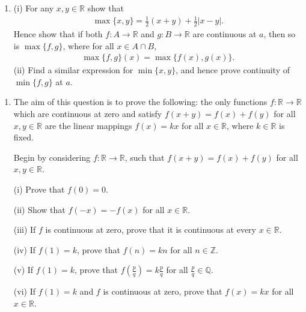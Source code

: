 \documentclass[letterpaper,10pt,english]{jupyterBook}
\begin{document}
\label{\detokenize{Problems:id20}}\begin{enumerate}
%
\setcounter{enumi}{19}
\item {} 
\sphinxAtStartPar
(i) For any \(x, y \in \mathbb{R}\) show that
\begin{equation*}
\begin{split}
    \max\{x, y\} = \frac{1}{2}(x + y) + \frac{1}{2}|x - y|.
    \end{split}
\end{equation*}
\sphinxAtStartPar
Hence show that if both \(f:A\to \mathbb{R}\) and \(g: B \rightarrow \mathbb{R}\) are continuous at \(a\), then so is \(\max\{f, g\}\), where for all \(x \in A\cap B\),
\begin{equation*}
\begin{split}
    \max\{f, g\}(x)  = \max\{f(x), g(x)\}.
    \end{split}
\end{equation*}
\sphinxAtStartPar
(ii) Find a similar expression for \(\min\{x, y\}\), and hence prove continuity of \(\min\{f, g\}\) at \(a\).

\end{enumerate}
\label{\detokenize{Problems:id21}}\begin{enumerate}
%
\setcounter{enumi}{20}
\item {} 
\sphinxAtStartPar
The aim of this question is to prove the following: the only functions \(f: \mathbb{R} \rightarrow \mathbb{R}\) which are continuous at zero and satisfy \(f(x+y) = f(x) + f(y)\) for all \(x,y \in \mathbb{R}\) are the linear mappings \(f(x) = kx\) for all \(x \in \mathbb{R}\), where \(k \in \mathbb{R}\) is fixed.

Begin by considering \(f: \mathbb{R} \rightarrow \mathbb{R}\), such that \(f(x+y) = f(x) + f(y)\) for all \(x,y \in \mathbb{R}\).

\sphinxAtStartPar
(i) Prove that \(f(0) = 0\).

\sphinxAtStartPar
(ii) Show that \(f(-x) = -f(x)\) for all \(x \in \mathbb{R}\).

\sphinxAtStartPar
(iii) If \(f\) is continuous at zero, prove that it is continuous at every \(x \in \mathbb{R}\).

\sphinxAtStartPar
(iv) If \(f(1) = k\), prove that \(f(n) = kn\) for all \(n\in \mathbb{Z}\).

\sphinxAtStartPar
(v) If \(f(1) = k\), prove that \(f\left(\frac{p}{q}\right) = k\frac{p}{q}\) for all \(\frac{p}{q} \in \mathbb{Q}\).

\sphinxAtStartPar
(vi) If \(f(1) = k\) and \(f\) is continuous at zero, prove that \(f(x) =kx\) for all \(x \in \mathbb{R}\).

\end{enumerate}
\end{document}
